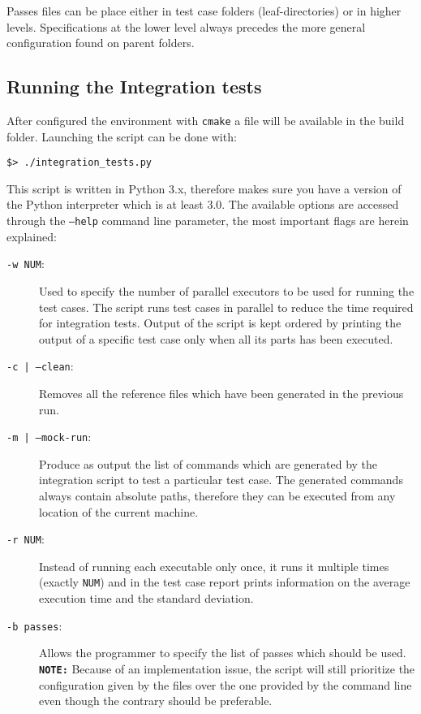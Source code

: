 Passes files can be place either in test case folders (leaf-directories) or in
higher levels. Specifications at the lower level always precedes the more
general configuration found on parent folders.  

\subsection{Running the Integration tests} 

After configured the environment with {\tt cmake} a 
file will be available in the build folder. Launching the script can be done
with:

\begin{verbatim}
$> ./integration_tests.py 
\end{verbatim}

This script is written in Python 3.x, therefore makes sure you have a version of
the Python interpreter which is at least 3.0.  The available options are
accessed through the {\tt --help} command line parameter, the most important
flags are herein explained:

\begin{description}

	\item [{\tt -w NUM}:] Used to specify the number of parallel executors to be
		used for running the test cases. The script runs test cases in parallel to
		reduce the time required for integration tests. Output of the script is
		kept ordered by printing the output of a specific test case only when all
		its parts has been executed. 

	\item [{\tt -c | --clean}:] Removes all the reference files which have been
		generated in the previous run. 

	\item[{\tt -m | --mock-run}:] Produce as output the list of commands which
		are generated by the integration script to test a particular test case.
		The generated commands always contain absolute paths, therefore they can
		be executed from any location of the current machine. 

	\item[{\tt -r NUM}:] Instead of running each executable only once, it runs it
		multiple times (exactly {\tt NUM}) and in the test case report prints
		information on the average execution time and the standard deviation. 

	\item[{\tt -b passes}:] Allows the programmer to specify the list of passes
		which should be used.  \\
		{\bf\tt NOTE:} Because of an implementation issue, the script will still
		prioritize the configuration given by the  files over the one
		provided by the command line even though the contrary should be
		preferable.

\end{description}

